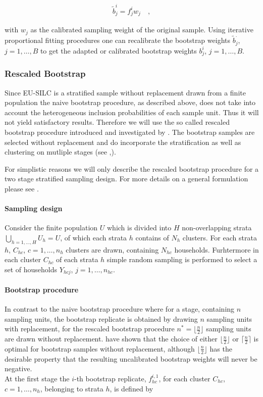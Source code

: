 \documentclass{scrartcl}
\begin{document}
\begin{align*}
  \tilde{b}_{j}^{i} = f_j^{i} w_j \quad,
\end{align*}

with $w_j$ as the calibrated sampling weight of the original sample.
Using iterative proportional fitting procedures one can recalibrate the bootstrap weights $\tilde{b}_{j}^{.}$, $j=1,\ldots,B$ to get the adapted or calibrated bootstrap weights $b_j^i$, $j=1,\ldots,B$.

\subsubsection{Rescaled Bootstrap}
Since EU-SILC is a stratified sample without replacement drawn from a finite population the naive bootstrap procedure, as described above, does not take into account the heterogeneous inclusion probabilities of each sample unit. Thus it will not yield satisfactory results. Therefore we will use the so called rescaled bootstrap procedure introduced and investigated by \citep{raowu1988}. The bootstrap samples are selected without replacement and do incorporate the stratification as well as clustering on mutliple stages (see \citep{chipprest2007},\citep{prest2009}).\\
\newline

For simplistic reasons we will only describe the rescaled bootstrap procedure for a two stage stratified sampling design. For more details on a general formulation please see \citep{prest2009}.

\paragraph{Sampling design}
Consider the finite population $U$ which is divided into $H$ non-overlapping strata $\bigcup\limits_{h=1,\ldots,H} U_h = U$, of which each strata $h$ contains of $N_h$ clusters. For each strata $h$, $C_{hc}$, $c=1,\ldots,n_h$ clusters are drawn, containing $N_{hc}$ households. Furhtermore in each cluster $C_{hc}$ of each strata $h$ simple random sampling is performed to select a set of households $Y_{hcj}$, $j=1,\ldots,n_{hc}$.

\paragraph{Bootstrap procedure}
In contrast to the naive bootstrap procedure where for a stage, containing $n$ sampling units, the bootstrap replicate is obtained by drawing $n$ sampling units with replacement, for the rescaled bootstrap procedure $n^*=\lfloor\frac{n}{2}\rfloor$ sampling units are drawn without replacement. \citep{chipprest2007} have shown that the choice of either $\lfloor\frac{n}{2}\rfloor$ or $\lceil\frac{n}{2}\rceil$ is optimal for bootstrap samples without replacement, although $\lfloor\frac{n}{2}\rfloor$ has the desirable property that the resulting uncalibrated bootstrap weights will never be negative.\\
\newline
At the first stage the $i$-th bootstrap replicate, $f^{i,1}_{hc}$, for each cluster $C_{hc}$,$c=1,\ldots,n_h$, belonging to strata $h$, is defined by
\end{document}
